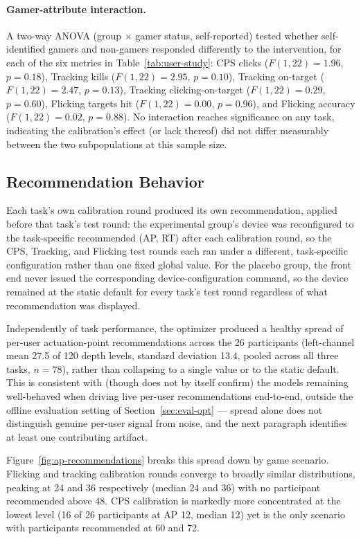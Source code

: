 \paragraph{Gamer-attribute interaction.} A two-way ANOVA (group $\times$ gamer
status, self-reported) tested whether self-identified gamers and non-gamers
responded differently to the intervention, for each of the six metrics in
Table~\ref{tab:user-study}: CPS clicks ($F(1,22)=1.96$, $p=0.18$), Tracking
kills ($F(1,22)=2.95$, $p=0.10$), Tracking on-target ($F(1,22)=2.47$,
$p=0.13$), Tracking clicking-on-target ($F(1,22)=0.29$, $p=0.60$), Flicking
targets hit ($F(1,22)=0.00$, $p=0.96$), and Flicking accuracy
($F(1,22)=0.02$, $p=0.88$). No interaction reaches significance on any task,
indicating the calibration's effect (or lack thereof) did not differ
measurably between the two subpopulations at this sample size.

\subsection{Recommendation Behavior}
Each task's own calibration round produced its own recommendation, applied
before that task's test round: the experimental group's device was
reconfigured to the task-specific recommended (AP, RT) after each
calibration round, so the CPS, Tracking, and Flicking test rounds each ran
under a different, task-specific configuration rather than one fixed global
value. For the placebo group, the front end never issued the corresponding
device-configuration command, so the device remained at the static default
for every task's test round regardless of what recommendation was displayed.

Independently of task performance, the optimizer produced a healthy spread of
per-user actuation-point recommendations across the 26 participants (left-channel
mean 27.5 of 120 depth levels, standard deviation 13.4, pooled across all three
tasks, $n=78$), rather than collapsing to a single value or to the static default. This is consistent with (though does
not by itself confirm) the models remaining well-behaved when driving live
per-user recommendations end-to-end, outside the offline evaluation setting of
Section~\ref{sec:eval-opt} --- spread alone does not distinguish genuine
per-user signal from noise, and the next paragraph identifies at least one
contributing artifact.



Figure~\ref{fig:ap-recommendations} breaks this spread down by game scenario.
Flicking and tracking calibration rounds converge to broadly similar
distributions, peaking at 24 and 36 respectively (median 24 and 36) with no
participant recommended above 48. CPS calibration is markedly more
concentrated at the lowest level (16 of 26 participants at AP 12, median 12)
yet is the only scenario with participants recommended at 60 and 72.


